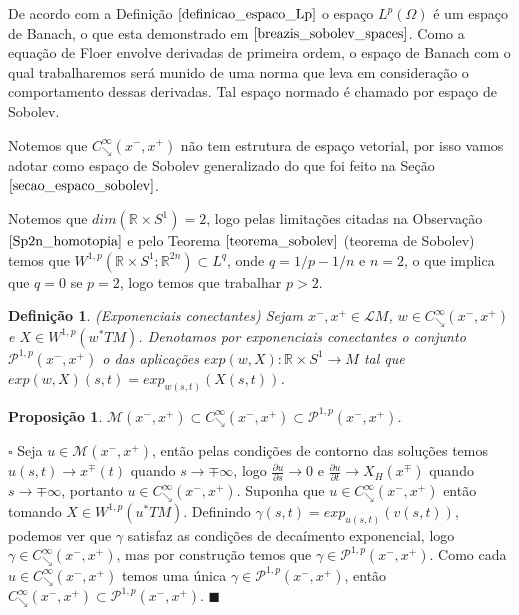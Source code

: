 \documentclass[12pt]{book}
\newtheorem{definicao}[teorema]{Definição}
\newtheorem{proposicao}[teorema]{Proposição}
\newenvironment{prova}[1]{$\square$ #1}{\hfill$\blacksquare$}
\newcommand{\aplicacaoexponencial}[2]{exp_{#1}(#2)}
\newcommand{\caminhosdecaimentoexponencial}[2]{C^{\infty}_{\searrow}(#1, #2)}
\newcommand{\caminhosdecaimentoexponencialpadrao}{\caminhosdecaimentoexponencial{x^{-}}{x^{+}}}
\newcommand{\caminhosexponenciaisconectantes}[2]{\mathcal{P}^{1,p}(#1, #2)}
\newcommand{\caminhosexponenciaisconectantespadrao}{\caminhosexponenciaisconectantes{x^{-}}{x^{+}}}
\newcommand{\circulo}{S^{1}}
\newcommand{\derivadaparcial}[2]{\frac{\partial #1}{\partial #2}}
\newcommand{\espacosobolev}[1]{W^{1,p}(#1)}
\newcommand{\espacosobolevcontradominio}[2]{W^{1,p}(#1;#2)}
\newcommand{\orbitasconectantespadrao}{\mathcal{M}(x^{-}, x^{+})}
\newcommand{\pullbackfibradotangente}[2]{#1^{*}T#2}
\newcommand{\pullbackfibradotangenteM}[1]{\pullbackfibradotangente{#1}{M}}
\newcommand{\retacartesianocirculo}{\real{} \times \circulo}
\newcommand{\real}[1]{\mathbb{R}^{#1}}
\newcommand{\solucoesperiodicascontrateis}{\mathcal{L}M}
\begin{document}
	De acordo com a Definição  $\ref{definicao_espaco_Lp}$ o espaço $L^{p}(\Omega)$ é um espaço de Banach, o que esta demonstrado em $\cite{breazis_sobolev_spaces}$. Como a equação de Floer envolve derivadas de primeira ordem, o espaço de Banach com o qual trabalharemos será munido de uma norma que leva em consideração o comportamento dessas derivadas. Tal espaço normado é chamado por espaço de Sobolev.
	
	Notemos que $\caminhosdecaimentoexponencialpadrao$ não tem estrutura de espaço vetorial, por isso vamos adotar como espaço de Sobolev generalizado do que foi feito na Seção $\ref{secao_espaco_sobolev}$. 
	
	Notemos que $dim(\retacartesianocirculo) = 2$, logo pelas limitações citadas na Observação $\ref{Sp2n_homotopia}$ e pelo Teorema $\ref{teorema_sobolev}$ (teorema de Sobolev) temos que $\espacosobolevcontradominio{\retacartesianocirculo}{\real{2n}} \subset L^{q}$, onde $q = 1/p - 1/n$ e $n = 2$, o que implica que $q = 0$ se $p=2$, logo temos que trabalhar $p>2$.
	
	\begin{definicao}
		(Exponenciais conectantes) Sejam $x^{-}, x^{+} \in \solucoesperiodicascontrateis$, $w \in \caminhosdecaimentoexponencialpadrao$ e $X \in \espacosobolev{\pullbackfibradotangenteM{w}}$. Denotamos por exponenciais conectantes  o conjunto $\caminhosexponenciaisconectantespadrao$ o das aplicações $exp(w,X):\retacartesianocirculo \to M$ tal que $exp(w,X)(s,t) = \aplicacaoexponencial{w(s,t)}{X(s,t)}$.
	\end{definicao}
	
	\begin{proposicao}
		$\orbitasconectantespadrao \subset \caminhosdecaimentoexponencialpadrao \subset  \caminhosexponenciaisconectantespadrao$.
	\end{proposicao}
	\begin{prova}
		Seja $u \in \orbitasconectantespadrao$, então pelas condições de contorno das soluções temos $u(s,t)  \to x^{\mp}(t)$ quando $s\to \mp \infty$, logo $\derivadaparcial{u}{s} \to 0$ e $\derivadaparcial{u}{t} \to X_{H}(x^{\mp})$ quando $s\to \mp \infty$, portanto $u \in \caminhosdecaimentoexponencialpadrao$. Suponha que $u \in \caminhosdecaimentoexponencialpadrao$ então tomando $X \in \espacosobolev{\pullbackfibradotangenteM{u}}$. Definindo $\gamma(s, t) =\aplicacaoexponencial{u(s, t)}{v(s, t)}$, podemos ver que $\gamma$ satisfaz as condições de decaímento exponencial, logo $\gamma \in \caminhosdecaimentoexponencialpadrao$, mas por construção temos que $\gamma \in \caminhosexponenciaisconectantespadrao$. Como cada $u \in \caminhosdecaimentoexponencialpadrao$ temos uma única $\gamma \in \caminhosexponenciaisconectantespadrao$, então $\caminhosdecaimentoexponencialpadrao \subset \caminhosexponenciaisconectantespadrao$. 
	\end{prova}
	
\end{document}
